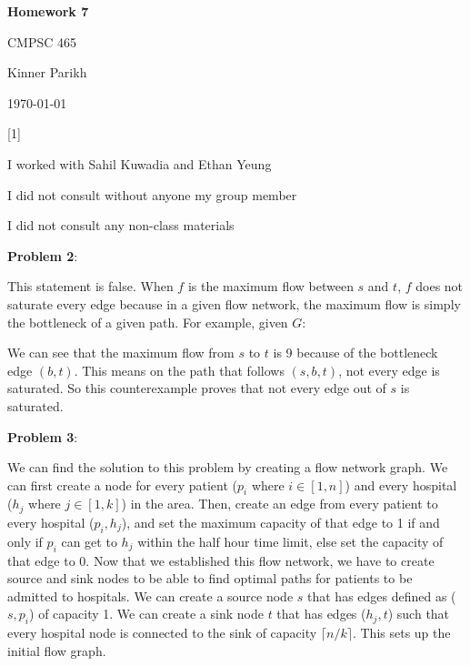 \documentclass{article} %
\newcommand{\question}[2][]{\begin{flushleft}
        \textbf{Problem #1}: \textit{#2}

\end{flushleft}}
\newcommand{\maketitletwo}[2][]{\begin{center}
        \Large{\textbf{Homework #1}
            
            CMPSC 465} %
        \vspace{5pt}
        
        \normalsize{Kinner Parikh  %
        
        \today}        %
        \vspace{40pt}


        \newpage
        
\end{center}}
\begin{document}
    \maketitletwo[7]  %

    \question[1]{}
    \begin{center}
        
        I worked with Sahil Kuwadia and Ethan Yeung
    
        I did not consult without anyone my group member
    
        I did not consult any non-class materials
    \end{center}
    
    \newpage

    \question[2]{}

    This statement is false. When $f$ is the maximum flow between $s$ and $t$, $f$ does not saturate every edge because in a given flow network, the maximum flow is simply the bottleneck of a given path. For example, given $G$:


    We can see that the maximum flow from $s$ to $t$ is 9 because of the bottleneck edge $(b, t)$. This means on the path that follows $(s, b, t)$, not every edge is saturated. So this counterexample proves that not every edge out of $s$ is saturated.

    \newpage

    \question[3]{}

    We can find the solution to this problem by creating a flow network graph. We can first create a node for every patient ($p_i$ where $i \in [1,n]$) and every hospital ($h_j$ where $j \in [1,k]$) in the area. Then, create an edge from every patient to every hospital ($p_i, h_j$), and set the maximum capacity of that edge to 1 if and only if $p_i$ can get to $h_j$ within the half hour time limit, else set the capacity of that edge to 0. Now that we established this flow network, we have to create source and sink nodes to be able to find optimal paths for patients to be admitted to hospitals. We can create a source node $s$ that has edges defined as ($s, p_i$) of capacity 1. We can create a sink node $t$ that has edges ($h_j, t$) such that every hospital node is connected to the sink of capacity $\lceil n/k \rceil$. This sets up the initial flow graph.
\end{document}
